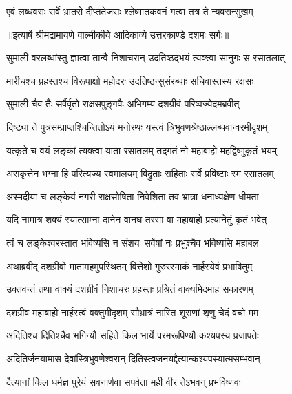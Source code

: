 \twolineshloka
{एवं लब्धवराः सर्वे भ्रातरो दीप्ततेजसः}
{श्लेष्मातकवनं गत्वा तत्र ते न्यवसन्सुखम्} %


{॥इत्यार्षे श्रीमद्रामायणे वाल्मीकीये आदिकाव्ये उत्तरकाण्डे दशमः सर्गः॥}


\twolineshloka
{सुमाली वरलब्धांस्तु ज्ञात्वा तान्वै निशाचरान्}
{उदतिष्ठद्भयं त्यक्त्वा सानुगः स रसातलात्} %

\twolineshloka
{मारीचश्च प्रहस्तश्च विरूपाक्षो महोदरः}
{उदतिष्ठन्सुसंरब्धाः सचिवास्तस्य रक्षसः} %

\twolineshloka
{सुमाली चैव तैः सर्वैर्वृतो राक्षसपुङ्गवैः}
{अभिगम्य दशग्रीवं परिष्वज्येदमब्रवीत्} %

\twolineshloka
{दिष्ट्या ते पुत्रसम्प्राप्तश्चिन्तितोऽयं मनोरथः}
{यस्त्वं त्रिभुवणश्रेष्ठाल्लब्धवान्वरमीदृशम्} %

\twolineshloka
{यत्कृते च वयं लङ्कां त्यक्त्वा याता रसातलम्}
{तद्गतं नो महाबाहो महद्विष्णुकृतं भयम्} %

\twolineshloka
{असकृत्तेन भग्ना हि परित्यज्य स्वमालयम्}
{विद्रुताः सहिताः सर्वे प्रविष्टाः स्म रसातलम्} %

\twolineshloka
{अस्मदीया च लङ्केयं नगरी राक्षसोषिता}
{निवेशिता तव भ्रात्रा धनाध्यक्षेण धीमता} %

\twolineshloka
{यदि नामात्र शक्यं स्यात्साम्ना दानेन वानघ}
{तरसा वा महाबाहो प्रत्यानेतुं कृतं भवेत्} %

\twolineshloka
{त्वं च लङ्केश्वरस्तात भविष्यसि न संशयः}
{सर्वेषां नः प्रभुश्चैव भविष्यसि महाबल} %

\twolineshloka
{अथाब्रवीद् दशग्रीवो मातामहमुपस्थितम्}
{वित्तेशो गुरुरस्माकं नार्हस्येवं प्रभाषितुम्} %

\twolineshloka
{उक्तवन्तं तथा वाक्यं दशग्रीवं निशाचरः}
{प्रहस्तः प्रश्रितं वाक्यमिदमाह सकारणम्} %

\twolineshloka
{दशग्रीव महाबाहो नार्हस्त्वं वक्तुमीदृशम्}
{सौभ्रात्रं नास्ति शूराणां शृणु चेदं वचो मम} %

\twolineshloka
{अदितिश्च दितिश्चैव भगिन्यौ सहिते किल}
{भार्ये परमरूपिण्यौ कश्यपस्य प्रजापतेः} %

\twolineshloka
{अदितिर्जनयामास देवांस्त्रिभुवणेश्वरान्}
{दितिस्त्वजनयद्दैत्यान्कश्यपस्यात्मसम्भवान्} %

\twolineshloka
{दैत्यानां किल धर्मज्ञ पुरेयं सवनार्णवा}
{सपर्वता मही वीर तेऽभवन् प्रभविष्णवः} %

